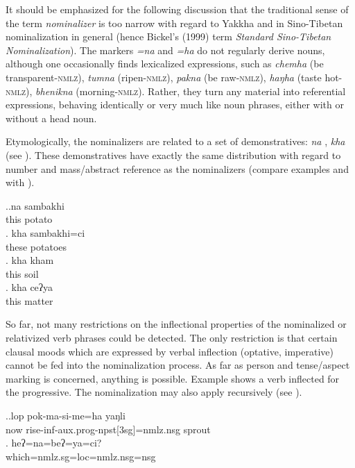 It should be emphasized for the following discussion that the traditional sense of the term \emph{nominalizer} is too narrow with regard to Yakkha and in Sino-Tibetan nominalization in general (hence Bickel's (1999) term \emph{Standard Sino-Tibetan Nominalization}).  The markers \emph{=na} and \emph{=ha} do not regularly derive nouns, although one occasionally finds lexicalized expressions, such as \emph{chemha}  (be transparent-\textsc{nmlz}),  \emph{tumna}  (ripen-\textsc{nmlz}), \emph{pakna}  (be raw-\textsc{nmlz}), \emph{haŋha}  (taste hot-\textsc{nmlz}), \emph{bhenikna}  (morning-\textsc{nmlz}). Rather, they  turn any material into referential expressions, behaving identically or very much like noun phrases, either with or without a head noun. 


Etymologically, the nominalizers are related to a set of demonstratives: \emph{na} , \emph{kha}  (see ). These demonstratives have exactly the same distribution with regard to number and mass/abstract reference as the nominalizers (compare examples \LLast and \Last with \Next).


\ex.\ag.na sambakhi\\
this potato\\
\bg. kha sambakhi=ci\\
these potatoes\\
\bg. kha kham\\
this soil\\
\bg. kha ceʔya\\
this matter\\


		 
So far, not many restrictions on the inflectional properties of the nominalized or relativized verb phrases could be detected. The only restriction is that certain clausal moods which are expressed by verbal inflection (optative, imperative) cannot be fed into the nominalization process. As far as person and tense/aspect marking is concerned, anything is possible. Example \Next[a] shows a verb inflected for the progressive. The nominalization may also apply recursively (see \Next[b]).


 \ex.\ag.lop pok-ma-si-me=ha yaŋli\\
 now rise-{\sc inf-aux.prog-npst[3sg]=nmlz.nsg} sprout\\
\bg.  	heʔ=na=beʔ=ya=ci?\\
		which{\sc =nmlz.sg=loc=nmlz.nsg=nsg}\\

